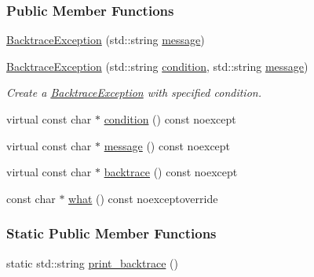 \subsubsection*{Public Member Functions}
\begin{DoxyCompactItemize}
\item 
\hyperlink{classbacktrace__exception_1_1BacktraceException_aa58cdade30cd7c6d60536e1f8d154fe0}{Backtrace\+Exception} (std\+::string \hyperlink{classbacktrace__exception_1_1BacktraceException_a35a4e3e649e4cbdcac45e5c6e0c9a8ec}{message})
\item 
\hyperlink{classbacktrace__exception_1_1BacktraceException_a7487e7b51e59aaae9a5cf0c9e5dc2498}{Backtrace\+Exception} (std\+::string \hyperlink{classbacktrace__exception_1_1BacktraceException_accccd52bdfdbb1ffca58a695dace84f2}{condition}, std\+::string \hyperlink{classbacktrace__exception_1_1BacktraceException_a35a4e3e649e4cbdcac45e5c6e0c9a8ec}{message})
\begin{DoxyCompactList}\small\item\em Create a \hyperlink{classbacktrace__exception_1_1BacktraceException}{Backtrace\+Exception} with specified condition. \end{DoxyCompactList}\item 
virtual const char $\ast$ \hyperlink{classbacktrace__exception_1_1BacktraceException_accccd52bdfdbb1ffca58a695dace84f2}{condition} () const noexcept
\item 
virtual const char $\ast$ \hyperlink{classbacktrace__exception_1_1BacktraceException_a35a4e3e649e4cbdcac45e5c6e0c9a8ec}{message} () const noexcept
\item 
virtual const char $\ast$ \hyperlink{classbacktrace__exception_1_1BacktraceException_a7454505fabaa8d6ef8396049f7d4e775}{backtrace} () const noexcept
\item 
const char $\ast$ \hyperlink{classbacktrace__exception_1_1BacktraceException_a865bf08728344df9ed42bb5f6aef048f}{what} () const noexceptoverride
\end{DoxyCompactItemize}
\subsubsection*{Static Public Member Functions}
\begin{DoxyCompactItemize}
\item 
static std\+::string \hyperlink{classbacktrace__exception_1_1BacktraceException_aef24b0571ea422191026a2292947810a}{print\+\_\+backtrace} ()
\end{DoxyCompactItemize}

